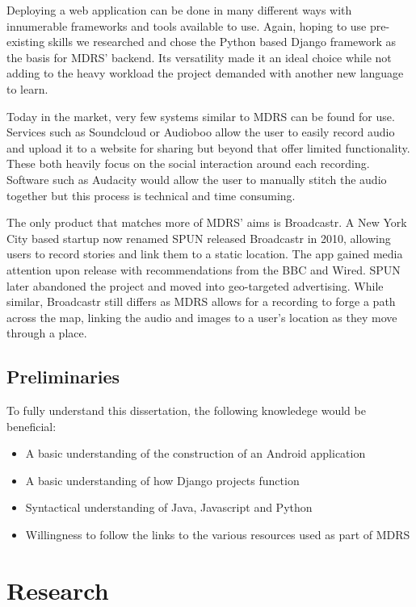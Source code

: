 \documentclass{l3proj}
\begin{document}
Deploying a web application can be done in many different ways with innumerable frameworks and tools available to use. Again, hoping to use pre-existing skills we researched and chose the Python based Django framework as the basis for MDRS’ backend. Its versatility made it an ideal choice while not adding to the heavy workload the project demanded with another new language to learn.

Today in the market, very few systems similar to MDRS can be found for use. Services such as Soundcloud or Audioboo allow the user to easily record audio and upload it to a website for sharing but beyond that offer limited functionality. These both heavily focus on the social interaction around each recording. Software such as Audacity would allow the user to manually stitch the audio together but this process is technical and time consuming.

The only product that matches more of MDRS’ aims is Broadcastr. A New York City based startup now renamed SPUN released Broadcastr in 2010, allowing users to record stories and link them to a static location. The app gained media attention upon release with recommendations from the BBC and Wired. SPUN later abandoned the project and moved into geo-targeted advertising. While similar, Broadcastr still differs as MDRS allows for a recording to forge a path across the map, linking the audio and images to a user’s location as they move through a place.

\section{Preliminaries}
To fully understand this dissertation, the following knowledege would be beneficial:
\begin{itemize}
\item A basic understanding of the construction of an Android application
\item A basic understanding of how Django projects function
\item Syntactical understanding of Java, Javascript and Python
\item Willingness to follow the links to the various resources used as part of MDRS
\end{itemize}

\chapter{Research}
\label{Research}
\end{document}
